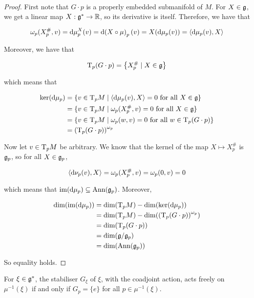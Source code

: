 \documentclass{article}
\begin{document}
\begin{proof}
    First note that \(G \cdot p\) is a properly embedded submanifold of \(M\). For \(X \in \mathfrak{g}\), we get a linear map \(X : \mathfrak{g}^* \to \mathbb{R}\), so its derivative is itself. Therefore, we have that

    \[\omega_p(X^\#_p, v) = \dd \mu^X_p(v) = \dd(X \circ \mu)_p(v) = X(\dd\mu_p(v)) = \left\langle \dd\mu_p(v), X \right\rangle\]

    Moreover, we have that

    \[\mathrm{T}_p(G \cdot p) = \left\{X_p^\# \mid X \in \mathfrak{g}\right\}\]

    which means that

    \begin{align*}
        \ker(\dd\mu_p) &= \{v \in \mathrm{T}_pM \mid \left\langle \dd\mu_p(v), X \right\rangle = 0 \text{ for all }X \in \mathfrak{g}\} \\
        &= \{v \in \mathrm{T}_pM \mid \omega_p(X_p^\#, v) = 0 \text{ for all }X \in \mathfrak{g}\} \\
        &= \{v \in \mathrm{T}_p M \mid \omega_p(w, v) = 0 \text{ for all }w \in \mathrm{T}_p(G\cdot p)\} \\
        &= \left(\mathrm{T}_p(G \cdot p)\right)^{\omega_p}
    \end{align*}

    Now let \(v \in \mathrm{T}_pM\) be arbitrary. We know that the kernel of the map \(X \mapsto X_p^\#\) is \(\mathfrak{g}_p\), so for all \(X \in \mathfrak{g}_p\),

    \[\left\langle \dd \nu_p(v), X \right\rangle = \omega_p(X_p^\#, v) = \omega_p(0, v) = 0\]

    which means that \(\operatorname{im}(\dd\mu_p) \subseteq \operatorname{Ann}(\mathfrak{g}_p)\). Moreover,

    \begin{align*}
        \dim(\operatorname{im}(\dd \mu_p)) &= \dim(\mathrm{T}_p M) - \dim(\ker(\dd\mu_p)) \\
        &= \dim(\mathrm{T}_pM) - \dim(\left(\mathrm{T}_p(G \cdot p)\right)^{\omega_p}) \\
        &= \dim(\mathrm{T}_p(G \cdot p)) \\
        &= \dim(\mathfrak{g}/\mathfrak{g}_p) \\
        &= \dim(\operatorname{Ann}(\mathfrak{g}_p))
    \end{align*}

    So equality holds.
\end{proof}

\begin{lemma}
    For \(\xi \in \mathfrak{g}^*\), the stabiliser \(G_\xi\) of \(\xi\), with the coadjoint action, acts freely on \(\mu^{-1}(\xi)\) if and only if \(G_p = \{e\}\) for all \(p \in \mu^{-1}(\xi)\).
\end{lemma}
\end{document}
